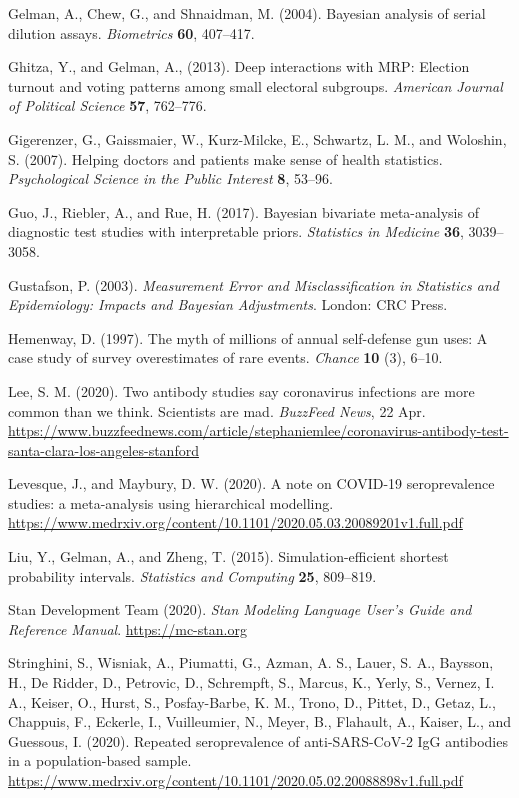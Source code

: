 \documentclass[11pt]{article}
\begin{document}
  \bibitem Gelman, A., Chew, G., and Shnaidman, M. (2004).  Bayesian analysis of serial dilution assays. {\em Biometrics} {\bf 60}, 407--417.

\bibitem Ghitza, Y., and Gelman, A., (2013). Deep interactions with MRP: Election turnout and voting patterns among small electoral subgroups. {\em American Journal of Political Science} {\bf 57}, 762--776.

\bibitem Gigerenzer, G., Gaissmaier, W., Kurz-Milcke, E., Schwartz, L. M., and Woloshin, S.  (2007).  Helping doctors and patients make sense of health statistics.  {\em Psychological Science in the Public Interest} {\bf 8}, 53--96.

\bibitem Guo, J., Riebler, A., and Rue, H. (2017).  Bayesian bivariate meta-analysis of diagnostic test studies with interpretable priors.  {\em Statistics in Medicine} {\bf 36}, 3039--3058.

\bibitem Gustafson, P. (2003).  {\em Measurement Error and Misclassification in Statistics and Epidemiology: Impacts and Bayesian Adjustments}.  London:  CRC Press.

\bibitem Hemenway, D. (1997).  The myth of millions of annual self-defense gun uses:  A case study of survey overestimates of rare events.  {\em Chance} {\bf 10} (3), 6--10.

\bibitem Lee, S. M. (2020).  Two antibody studies say coronavirus infections are more common than we think. Scientists are mad.  {\em BuzzFeed News}, 22 Apr.  \url{https://www.buzzfeednews.com/article/stephaniemlee/coronavirus-antibody-test-santa-clara-los-angeles-stanford}

\bibitem Levesque, J., and Maybury, D. W. (2020).  A note on COVID-19 seroprevalence studies: a meta-analysis using hierarchical modelling.  \url{https://www.medrxiv.org/content/10.1101/2020.05.03.20089201v1.full.pdf}

\bibitem Liu, Y., Gelman, A., and Zheng, T. (2015).  Simulation-efficient shortest probability intervals. {\em Statistics and Computing} {\bf 25}, 809--819.

\bibitem Stan Development Team (2020). {\em Stan Modeling Language User's Guide and Reference Manual}.  \url{https://mc-stan.org}

\bibitem Stringhini, S., Wisniak, A., Piumatti, G., Azman, A. S., Lauer, S. A., Baysson, H., De Ridder, D., Petrovic, D.,  Schrempft, S., Marcus, K., Yerly, S., Vernez, I. A., Keiser, O., Hurst, S., Posfay-Barbe, K. M., Trono, D., Pittet, D., Getaz, L., Chappuis, F., Eckerle, I., Vuilleumier, N., Meyer, B., Flahault, A., Kaiser, L., and Guessous, I. (2020).  Repeated seroprevalence of anti-SARS-CoV-2 IgG antibodies in a population-based sample.  \url{https://www.medrxiv.org/content/10.1101/2020.05.02.20088898v1.full.pdf}
\end{document}
